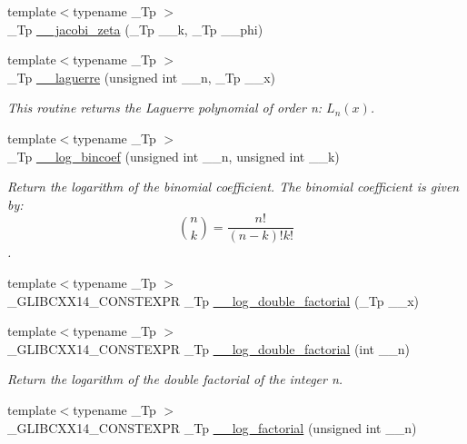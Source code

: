 \begin{DoxyCompactItemize}
\item 
{\footnotesize template$<$typename \+\_\+\+Tp $>$ }\\\+\_\+\+Tp \hyperlink{namespacestd_1_1____detail_a1d5fc69202703d72974c4370fd7ade03}{\+\_\+\+\_\+jacobi\+\_\+zeta} (\+\_\+\+Tp \+\_\+\+\_\+k, \+\_\+\+Tp \+\_\+\+\_\+phi)
\item 
{\footnotesize template$<$typename \+\_\+\+Tp $>$ }\\\+\_\+\+Tp \hyperlink{namespacestd_1_1____detail_aa714c4983a3cb7d9d18e0c2c5a8f6826}{\+\_\+\+\_\+laguerre} (unsigned int \+\_\+\+\_\+n, \+\_\+\+Tp \+\_\+\+\_\+x)
\begin{DoxyCompactList}\small\item\em This routine returns the Laguerre polynomial of order n\+: $ L_n(x) $. \end{DoxyCompactList}\item 
{\footnotesize template$<$typename \+\_\+\+Tp $>$ }\\\+\_\+\+Tp \hyperlink{namespacestd_1_1____detail_a152324942f37ae3c6fc65aec1f17049e}{\+\_\+\+\_\+log\+\_\+bincoef} (unsigned int \+\_\+\+\_\+n, unsigned int \+\_\+\+\_\+k)
\begin{DoxyCompactList}\small\item\em Return the logarithm of the binomial coefficient. The binomial coefficient is given by\+: \[ \binom{n}{k} = \frac{n!}{(n-k)! k!} \]. \end{DoxyCompactList}\item 
{\footnotesize template$<$typename \+\_\+\+Tp $>$ }\\\+\_\+\+G\+L\+I\+B\+C\+X\+X14\+\_\+\+C\+O\+N\+S\+T\+E\+X\+P\+R \+\_\+\+Tp \hyperlink{namespacestd_1_1____detail_a0de46e790512550b535bdda97e11e1b5}{\+\_\+\+\_\+log\+\_\+double\+\_\+factorial} (\+\_\+\+Tp \+\_\+\+\_\+x)
\item 
{\footnotesize template$<$typename \+\_\+\+Tp $>$ }\\\+\_\+\+G\+L\+I\+B\+C\+X\+X14\+\_\+\+C\+O\+N\+S\+T\+E\+X\+P\+R \+\_\+\+Tp \hyperlink{namespacestd_1_1____detail_aa832ed1d29fd41c40cf892cc1feef7e9}{\+\_\+\+\_\+log\+\_\+double\+\_\+factorial} (int \+\_\+\+\_\+n)
\begin{DoxyCompactList}\small\item\em Return the logarithm of the double factorial of the integer n. \end{DoxyCompactList}\item 
{\footnotesize template$<$typename \+\_\+\+Tp $>$ }\\\+\_\+\+G\+L\+I\+B\+C\+X\+X14\+\_\+\+C\+O\+N\+S\+T\+E\+X\+P\+R \+\_\+\+Tp \hyperlink{namespacestd_1_1____detail_a2809419dbbe9fc60066dacfdc13761d4}{\+\_\+\+\_\+log\+\_\+factorial} (unsigned int \+\_\+\+\_\+n)

\end{DoxyCompactItemize}
